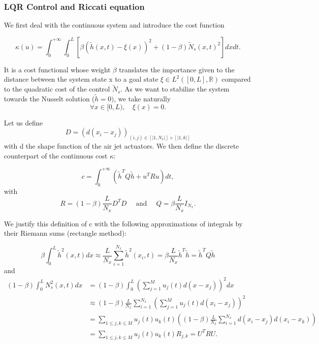 \documentclass[12pt]{article}
\begin{document}
\subsubsection{LQR Control and Riccati equation}
We first deal with the continuous system and introduce the cost function 

\begin{equation}
    \kappa(u) = \int_0^{+\infty}\int_0^L \left[\beta (\tilde{h}(x,t)-\xi(x))^2+ (1-\beta)\tilde{N}_s(x,t)^2\right]dxdt.
\end{equation}

It is a cost functional whose weight $\beta$ translates the importance given to the distance between the system state x to a goal state $\xi \in L^2([0,L],\mathbb{R})$ compared to the quadratic cost of the control
$\tilde{N}_s$. As we want to stabilize the system towards the Nusselt solution ($\tilde{h}=0)$, we take naturally $$\forall x\in [0,L), \quad\xi(x) = 0.$$




Let us define $$D=(d(x_i-x_j))_{(i,j)\in [|1,N_x|]\times [|1,k|]}$$ with d the shape function of the air jet actuators. We then define the discrete counterpart of the continuous cost $\kappa$: 

\begin{equation}\label{eq_LQR_discrete_cost}
\boxed{
    c = \int_0^{+\infty}(\tilde{h}^TQ\tilde{h}+u^TRu)dt},
\end{equation}
with 
\begin{equation}\label{eq_LQR_discrete_cost_matrices}
   R=(1-\beta)\frac{L}{N_x}D^TD\quad \text{ and } \quad  Q=\beta \frac{L}{N_x}I_{N_x}.
\end{equation}

We justify this definition of c with the following approximations of integrals by their Riemann sums (rectangle method):

$$\beta\int_0^L\tilde{h}^2(x,t)dx \boxed{\approx} \frac{L}{N_x}\sum_{i=1}^{N_x}\tilde{h}^2(x_i,t) = \beta\frac{L}{N_x}\tilde{h}^T\tilde{h}=\tilde{h}^TQ\tilde{h}$$
and 
\begin{align*} (1-\beta)\int_0^L N_s^2(x, t)dx &= (1-\beta)\int_0^L(\sum_{j=1}^{M}u_j(t)d(x-x_j))^2dx \\ &\boxed{\approx} (1-\beta)\frac{L}{N_x}\sum_{i=1}^{N_x}(\sum_{j=1}^{M}u_j(t)d(x_i-x_j))^2 \\&= \sum_{1\leq j, k\leq M}u_j(t)u_k(t)((1-\beta)\frac{L}{N_x}\sum_{i=1}^{N_x}d(x_i-x_j)d(x_i-x_k)) \\ &= \sum_{1\leq j, k\leq M}u_j(t)u_k(t) R_{j,k} = U^TRU.\end{align*}
\end{document}
